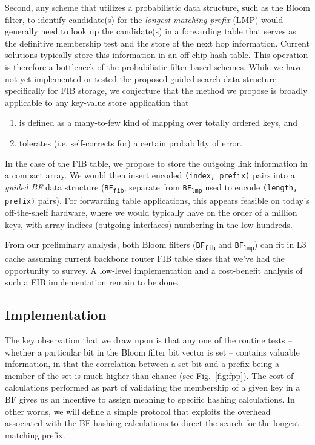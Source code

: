 \documentclass[conference,compsoc]{IEEEtran}
\begin{document}
Second, any scheme that utilizes a probabilistic data structure, such as
the Bloom filter, to identify candidate(s) for the \emph{longest matching
prefix} (LMP) would generally need to look up the candidate(s)
in a forwarding table that serves as the definitive membership
test and the store of the next hop information. Current solutions typically
store this information in an off-chip hash table. This operation is therefore
a bottleneck of the probabilistic filter-based schemes. While we have
not yet implemented or tested the proposed guided search data structure
specifically for FIB storage, we conjecture that the method we propose is broadly
applicable to any key-value store application that

\begin{enumerate}[label=(\alph*)]
\item is defined as a many-to-few kind of mapping over totally ordered keys, and
\item tolerates (i.e. self-corrects for) a certain probability of error.
\end{enumerate}

In the case of the FIB table, we propose to store the outgoing link information
in a compact array. We would then insert encoded \texttt{(index, prefix)} pairs
into a \emph{guided BF} data structure (\texttt{BF\textsubscript{fib}}, 
separate from \texttt{BF\textsubscript{lmp}} used to
encode \texttt{(length, prefix)} pairs). For forwarding table applications, this appears 
feasible on today's off-the-shelf hardware, where we would typically have 
on the order of a
million keys, with array indices (outgoing interfaces) numbering in the low 
hundreds.

From our preliminary analysis, both Bloom filters (\texttt{BF\textsubscript{fib}}
and \texttt{BF\textsubscript{lmp}}) can fit in L3 cache assuming
current backbone router FIB table sizes that we've had the opportunity to
survey. A low-level implementation and a cost-benefit analysis of such a FIB 
implementation remain to be done.


\subsection{Implementation}

The key observation that we draw upon is that any one of the routine
tests -- whether a particular bit in the Bloom filter bit vector
is set -- contains valuable information, in that the correlation between
a set bit and a prefix being a member of the set is much higher than chance
(see Fig.~\ref{fig:fpp}). The cost of calculations performed as part of
validating the membership of a given key in a BF gives us an incentive to
assign meaning to specific hashing calculations. In other words, we will 
define a simple protocol that exploits the overhead associated with the
BF hashing calculations to direct the search for the longest matching prefix.
\end{document}
